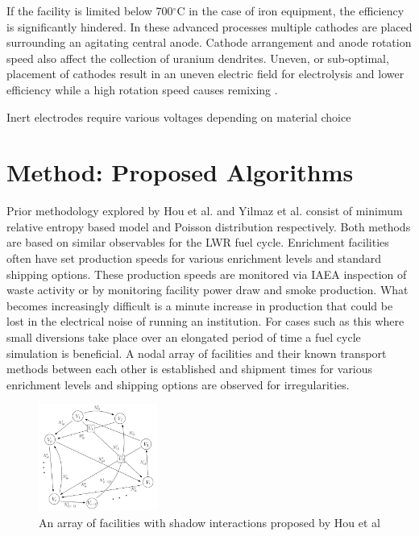 \documentclass{anstrans}
\begin{document}
If the facility is limited below 700$^{\circ}$C in the case of iron equipment, the efficiency is significantly hindered. In these advanced processes multiple cathodes are placed surrounding an agitating central anode. Cathode arrangement and anode rotation speed also affect the collection of uranium dendrites. Uneven, or sub-optimal, placement of cathodes result in an uneven electric field for electrolysis and lower efficiency while a high rotation speed causes remixing \cite{lee_advanced_nodate}.

Inert electrodes require various voltages depending on material choice \cite{koyama_development_2012}
\section{Method: Proposed Algorithms}
Prior methodology explored by Hou et al. and Yilmaz et al. \cite{Hou_2016,Yilmaz_2016} consist of minimum relative entropy based model and Poisson distribution respectively. Both methods are based on similar observables for the LWR fuel cycle. Enrichment facilities often have set production speeds for various enrichment levels and standard shipping options. These production speeds are monitored via IAEA inspection of waste activity or by monitoring facility power draw and smoke production. What becomes increasingly difficult is a minute increase in production that could be lost in the electrical noise of running an institution. For cases such as this where small diversions take place over an elongated period of time a fuel cycle simulation is beneficial. A nodal array of facilities and their known transport methods between each other is established and shipment times for various enrichment levels and shipping options are observed for irregularities. 

\begin{figure}[ht] %
	\centering
	\includegraphics[width=0.35\textwidth]{Hou_Network}
	\caption{An array of facilities with shadow interactions proposed by Hou et al\cite{Hou_2016}}
	\label{fig:maximumlikelihood}
\end{figure}
\end{document}

